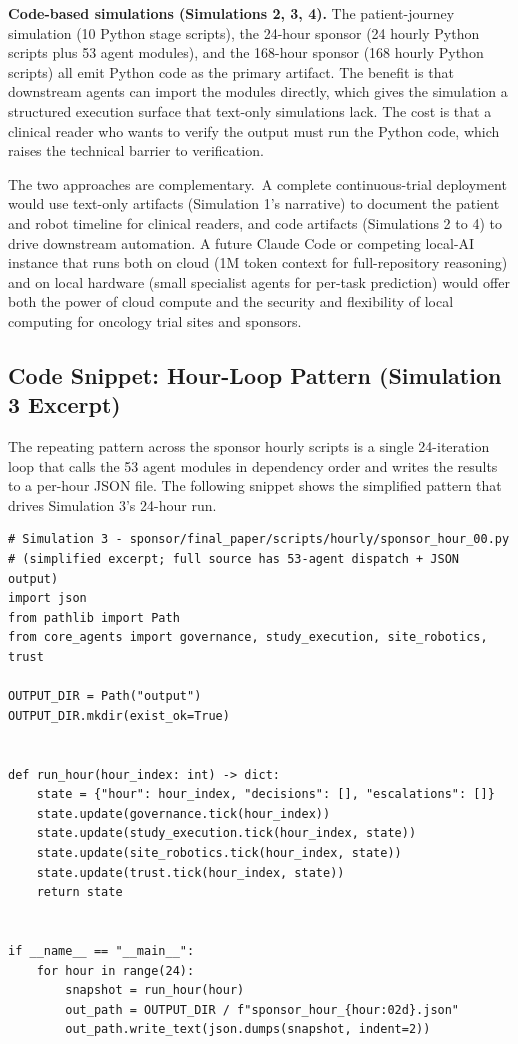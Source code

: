 \textbf{Code-based simulations (Simulations 2, 3, 4).} The
patient-journey simulation (10 Python stage scripts), the 24-hour
sponsor (24 hourly Python scripts plus 53 agent modules), and the
168-hour sponsor (168 hourly Python scripts) all emit Python code as
the primary artifact. The benefit is that downstream agents can
import the modules directly, which gives the simulation a structured
execution surface that text-only simulations lack. The cost is that
a clinical reader who wants to verify the output must run the Python
code, which raises the technical barrier to verification.

The two approaches are complementary.\ A complete continuous-trial
deployment would use text-only artifacts (Simulation 1's narrative)
to document the patient and robot timeline for clinical readers, and
code artifacts (Simulations 2 to 4) to drive downstream automation.
A future Claude Code or competing local-AI instance that runs both on
cloud (1M token context for full-repository reasoning) and on local
hardware (small specialist agents for per-task prediction) would offer
both the power of cloud compute and the security and flexibility of
local computing for oncology trial sites and sponsors.

\clearpage

\subsection{Code Snippet: Hour-Loop Pattern (Simulation 3 Excerpt)}
\label{sec:methods-snippet}

The repeating pattern across the sponsor hourly scripts is a single
24-iteration loop that calls the 53 agent modules in dependency order
and writes the results to a per-hour JSON file. The following snippet
shows the simplified pattern that drives Simulation 3's 24-hour run.

\begin{lstlisting}
# Simulation 3 - sponsor/final_paper/scripts/hourly/sponsor_hour_00.py
# (simplified excerpt; full source has 53-agent dispatch + JSON output)
import json
from pathlib import Path
from core_agents import governance, study_execution, site_robotics, trust

OUTPUT_DIR = Path("output")
OUTPUT_DIR.mkdir(exist_ok=True)


def run_hour(hour_index: int) -> dict:
    state = {"hour": hour_index, "decisions": [], "escalations": []}
    state.update(governance.tick(hour_index))
    state.update(study_execution.tick(hour_index, state))
    state.update(site_robotics.tick(hour_index, state))
    state.update(trust.tick(hour_index, state))
    return state


if __name__ == "__main__":
    for hour in range(24):
        snapshot = run_hour(hour)
        out_path = OUTPUT_DIR / f"sponsor_hour_{hour:02d}.json"
        out_path.write_text(json.dumps(snapshot, indent=2))
\end{lstlisting}

